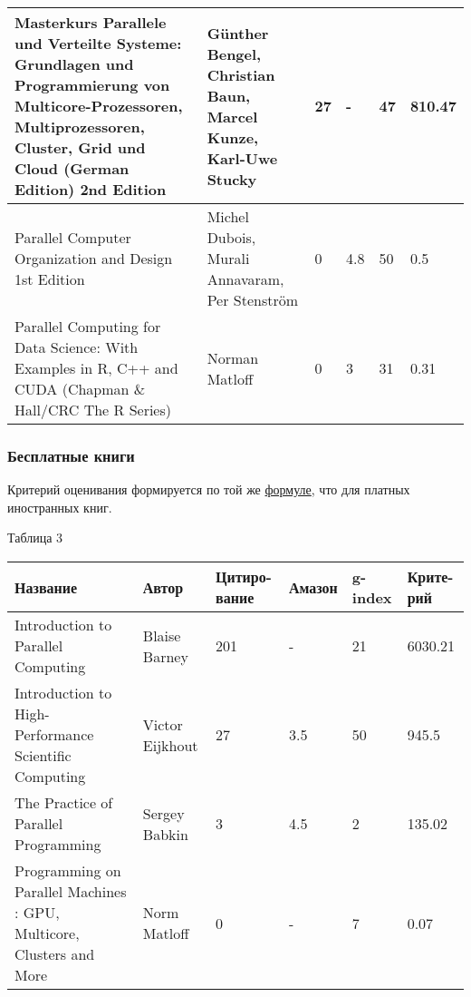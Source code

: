 \documentclass{article}
\begin{document}
\begin{flushleft}
\begin{longtable}{|p{6cm}|p{2.4cm}|p{1.6cm}|p{1.55cm}|p{1.55cm}|p{1.7cm}|}
Masterkurs Parallele und Verteilte Systeme: Grundlagen und Programmierung von Multicore-Prozessoren, Multiprozessoren, Cluster, Grid und Cloud (German Edition) 2nd Edition &
Günther Bengel, Christian Baun, Marcel Kunze, Karl-Uwe Stucky & 27 & - & 47 & 810.47\\\hline

Parallel Computer Organization and Design 1st Edition &
Michel Dubois, Murali Annavaram, Per Stenström & 0 & 4.8 & 50 & 0.5\\\hline

Parallel Computing for Data Science: With Examples in R, C++ and CUDA (Chapman \& Hall/CRC The R Series) &
Norman Matloff & 0 & 3 & 31 & 0.31\\\hline

				\end{longtable}
			\end{flushleft}
\newpage
		\subsubsection{Бесплатные книги}
			Критерий оценивания формируется по той же \hyperlink{formula1}{формуле}, что для платных иностранных книг.
			
			\begin{flushleft}
				Таблица 3
				\begin{longtable}{|p{6cm}|p{2.4cm}|p{1.6cm}|p{1.55cm}|p{1.55cm}|p{1.7cm}|}
\hline
Название & Автор & Цитиро-вание & Амазон & g-index & Крите-рий \\\hline

Introduction to Parallel Computing &
Blaise Barney & 201 & - & 21 & 6030.21\\\hline
 
Introduction to High-Performance Scientific Computing &
Victor Eijkhout & 27 & 3.5 & 50 & 945.5\\\hline

The Practice of Parallel Programming &
Sergey Babkin & 3 & 4.5 & 2 & 135.02\\\hline

Programming on Parallel Machines : GPU, Multicore, Clusters and More &
Norm Matloff & 0 & - & 7 & 0.07 \\\hline
				\end{longtable}
			\end{flushleft}
\newpage
\end{document}
